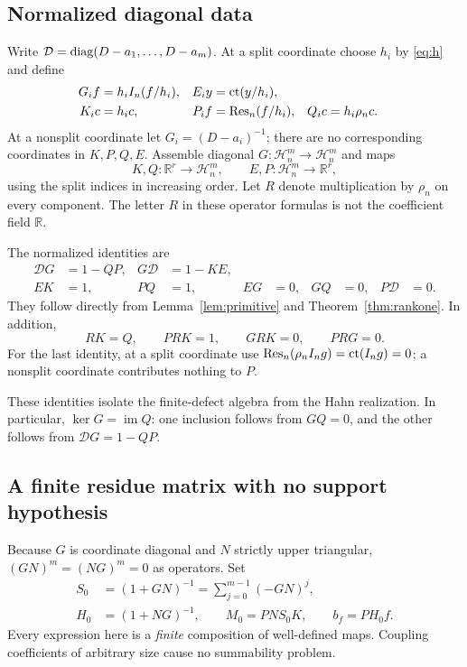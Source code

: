 \documentclass[11pt,a4paper]{article}
\numberwithin{equation}{section}
\theoremstyle{definition}
\theoremstyle{remark}\newtheorem{remark}[theorem]{Remark}
\newcommand{\R}{\mathbb R}\newcommand{\C}{\mathbb C}
\newcommand{\Hh}{\mathcal H}\newcommand{\Ll}{\mathcal L}
\newcommand{\Res}{\operatorname{Res}}\newcommand{\supp}{\operatorname{supp}}
\newcommand{\im}{\operatorname{im}}\newcommand{\coker}{\operatorname{coker}}
\begin{document}
\subsection{Normalized diagonal data}
Write $\mathcal D=\operatorname{diag}(D-a_1,\ldots,D-a_m)$. At a split coordinate choose $h_i$ by \eqref{eq:h} and define
\begin{align}
 G_i f&=h_iI_n(f/h_i),& E_i y&=\ct(y/h_i),\label{eq:regularmaps}\\
 K_i c&=h_i c,& P_i f&=\Res_n(f/h_i),& Q_i c&=h_i\rho_n c.\nonumber
\end{align}
At a nonsplit coordinate let $G_i=(D-a_i)^{-1}$; there are no corresponding coordinates in $K,P,Q,E$. Assemble diagonal $G:\Hh_n^m\to\Hh_n^m$ and maps
\[
 K,Q:\R^r\to\Hh_n^m,\qquad E,P:\Hh_n^m\to\R^r,
\]
using the split indices in increasing order. Let $R$ denote multiplication by $\rho_n$ on every component. The letter $R$ in these operator formulas is not the coefficient field $\R$.

The normalized identities are
\begin{align}
 \mathcal D G&=1-QP,&G\mathcal D&=1-KE,\label{eq:splitting}\\
 EK&=1,&PQ&=1,&EG&=0,&GQ&=0,&P\mathcal D&=0.\label{eq:normalization}
\end{align}
They follow directly from Lemma~\ref{lem:primitive} and Theorem~\ref{thm:rankone}. In addition,
\begin{equation}
 RK=Q,\qquad PRK=1,\qquad GRK=0,\qquad PRG=0.
 \label{eq:crossing}
\end{equation}
For the last identity, at a split coordinate use
$\Res_n(\rho_nI_ng)=\ct(I_ng)=0$; a nonsplit coordinate contributes nothing to $P$.

These identities isolate the finite-defect algebra from the Hahn realization. In particular, $\ker G=\im Q$: one inclusion follows from $GQ=0$, and the other follows from $\mathcal DG=1-QP$.

\subsection{A finite residue matrix with no support hypothesis}
Because $G$ is coordinate diagonal and $N$ strictly upper triangular, $(GN)^m=(NG)^m=0$ as operators. Set
\begin{align}
 S_0&=(1+GN)^{-1}=\sum_{j=0}^{m-1}(-GN)^j,\label{eq:S0}\\
 H_0&=(1+NG)^{-1},\qquad
 M_0=PNS_0K,\qquad b_f=PH_0f.\label{eq:M0}
\end{align}
Every expression here is a \emph{finite} composition of well-defined maps. Coupling coefficients of arbitrary size cause no summability problem.
\end{document}
